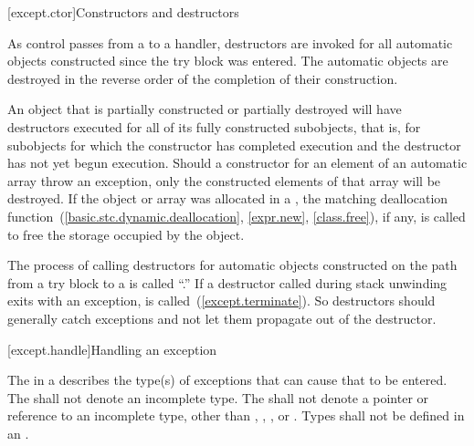 [except.ctor]{Constructors and destructors}%
%
%
%

\pnum
As control passes from a
to a handler,
destructors are invoked for all automatic objects constructed since the
try block was entered.
The automatic objects are destroyed in the reverse order of the completion
of their construction.

\pnum
An object that is partially constructed or partially destroyed will have
destructors executed for all of its fully constructed subobjects,
that is, for subobjects for which the constructor has completed execution
and the destructor has not yet begun execution. Should a constructor
for an element of an automatic array throw an exception, only the
constructed elements of that array will be destroyed.
If the object or array was allocated in a
,
the matching deallocation function~(\ref{basic.stc.dynamic.deallocation}, \ref{expr.new}, \ref{class.free}),
if any, is called to free the storage occupied by the object.

\pnum
{}%
The process of calling destructors for automatic objects constructed on the
path from a try block to a
is called
``.''
\enternote
If a destructor called during stack unwinding exits with an exception,
is called~(\ref{except.terminate}).
So destructors should generally catch
exceptions and not let them propagate out of the destructor.
\exitnoteb

[except.handle]{Handling an exception}
%

\pnum
The
in a
describes the type(s) of exceptions that can cause
that
to be entered.
%
%
%
%
The
shall not denote an incomplete type.
The
shall not denote a pointer or reference to an
incomplete type, other than
,
,
,
or
.
Types shall not be defined in an
.

